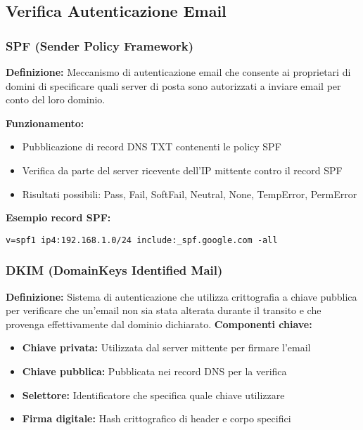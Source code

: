 \documentclass{article}
\begin{document}
\subsection{Verifica Autenticazione Email}

\subsubsection{SPF (Sender Policy Framework)}
\textbf{Definizione:} Meccanismo di autenticazione email che consente ai proprietari di domini di specificare quali server di posta sono autorizzati a inviare email per conto del loro dominio.

\textbf{Funzionamento:}
\begin{itemize}
    \item Pubblicazione di record DNS TXT contenenti le policy SPF
    \item Verifica da parte del server ricevente dell'IP mittente contro il record SPF
    \item Risultati possibili: Pass, Fail, SoftFail, Neutral, None, TempError, PermError
\end{itemize}

\textbf{Esempio record SPF:}
\begin{lstlisting}[caption=Esempio record SPF]
v=spf1 ip4:192.168.1.0/24 include:_spf.google.com -all
\end{lstlisting}

\subsubsection{DKIM (DomainKeys Identified Mail)}
\textbf{Definizione:} Sistema di autenticazione che utilizza crittografia a chiave pubblica per verificare che un'email non sia stata alterata durante il transito e che provenga effettivamente dal dominio dichiarato.
\newline \newline
\textbf{Componenti chiave:}
\begin{itemize}
    \item \textbf{Chiave privata:} Utilizzata dal server mittente per firmare l'email
    \item \textbf{Chiave pubblica:} Pubblicata nei record DNS per la verifica
    \item \textbf{Selettore:} Identificatore che specifica quale chiave utilizzare
    \item \textbf{Firma digitale:} Hash crittografico di header e corpo specifici
\end{itemize}
\end{document}
